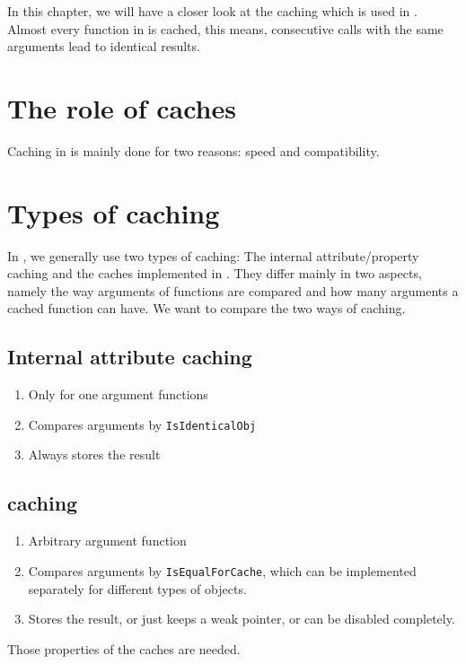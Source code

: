 In this chapter, we will have a closer look at the caching
which is used in \CapPkg. Almost every function in \CapPkg is cached,
this means, consecutive calls with the same arguments lead to identical results.

\section{The role of caches}

Caching in \CapPkg is mainly done for two reasons: speed and compatibility.

\section{Types of caching}

In \CapPkg, we generally use two types of caching: The \GAP internal attribute/property caching and
the caches implemented in \CapPkg. They differ mainly in two aspects, namely the way arguments of
functions are compared and how many arguments a cached function can have. We want to compare the two
ways of caching.

\subsection{Internal attribute caching}
\begin{enumerate}
 \item Only for one argument functions
 \item Compares arguments by \texttt{IsIdenticalObj}
 \item Always stores the result
\end{enumerate}

\subsection{\CapPkg caching}
\begin{enumerate}
 \item Arbitrary argument function
 \item Compares arguments by \texttt{IsEqualForCache}, which can be implemented separately for different types of objects.
 \item Stores the result, or just keeps a weak pointer, or can be disabled completely.
\end{enumerate}

Those properties of the \CapPkg caches are needed.

